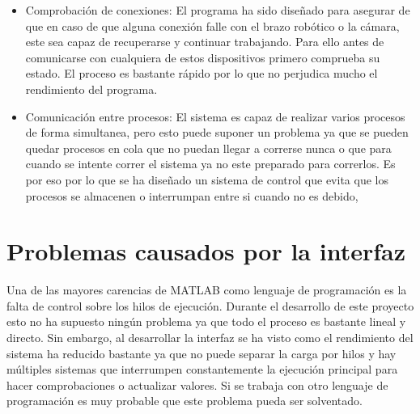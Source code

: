 \begin{itemize}
\item Comprobación de conexiones: El programa ha sido diseñado para asegurar de que en caso de que alguna conexión falle con el brazo robótico o la cámara, este sea capaz de recuperarse y continuar trabajando. Para ello antes de comunicarse con cualquiera de estos dispositivos primero comprueba su estado. El proceso es bastante rápido por lo que no perjudica mucho el rendimiento del programa.
\item Comunicación entre procesos: El sistema es capaz de realizar varios procesos de forma simultanea, pero esto puede suponer un problema ya que se pueden quedar procesos en cola que no puedan llegar a correrse nunca o que para cuando se intente correr el sistema ya no este preparado para correrlos. Es por eso por lo que se ha diseñado un sistema de control que evita que los procesos se almacenen o interrumpan entre si cuando no es debido,
\end{itemize}

\section{Problemas causados por la interfaz}
Una de las mayores carencias de MATLAB como lenguaje de programación es la falta de control sobre los hilos de ejecución. Durante el desarrollo de este proyecto esto no ha supuesto ningún problema ya que todo el proceso es bastante lineal y directo. Sin embargo, al desarrollar la interfaz se ha visto como el rendimiento del sistema ha reducido bastante ya que no puede separar la carga por hilos y hay múltiples sistemas que interrumpen constantemente la ejecución principal para hacer comprobaciones o actualizar valores. Si se trabaja con otro lenguaje de programación es muy probable que este problema pueda ser solventado.